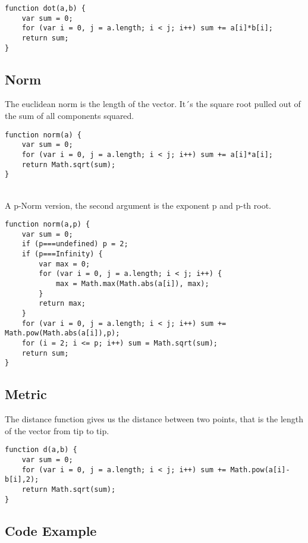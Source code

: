 \documentclass[a4paper]{article}
\begin{document}
\begin{PropositionOpt4}
\begin{lstlisting}
function dot(a,b) {
    var sum = 0;
    for (var i = 0, j = a.length; i < j; i++) sum += a[i]*b[i];
    return sum;
}
\end{lstlisting}

\subsection{Norm}

The euclidean norm is the length of the vector. It´s the square root pulled out of the sum of all components squared.\\

\begin{lstlisting}
function norm(a) {
    var sum = 0;
    for (var i = 0, j = a.length; i < j; i++) sum += a[i]*a[i];
    return Math.sqrt(sum);
}
\end{lstlisting}\\

A p-Norm version, the second argument is the exponent p and p-th root.\\

\begin{lstlisting}
function norm(a,p) {
    var sum = 0;
    if (p===undefined) p = 2;
    if (p===Infinity) {
        var max = 0;
        for (var i = 0, j = a.length; i < j; i++) {
            max = Math.max(Math.abs(a[i]), max);
        }
        return max;
    }
    for (var i = 0, j = a.length; i < j; i++) sum += Math.pow(Math.abs(a[i]),p);
    for (i = 2; i <= p; i++) sum = Math.sqrt(sum);
    return sum;
}
\end{lstlisting}

\subsection {Metric}

The distance function gives us the distance between two points, that is the length of the vector from tip to tip.

\begin{lstlisting}
function d(a,b) {
    var sum = 0;
    for (var i = 0, j = a.length; i < j; i++) sum += Math.pow(a[i]-b[i],2);
    return Math.sqrt(sum);
}
\end{lstlisting}


\subsection{Code Example}


\end{PropositionOpt4}
\end{document}
